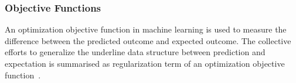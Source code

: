 \subsubsection{Objective Functions}
An optimization objective function in machine learning is used to measure the difference between the predicted outcome and expected outcome. The collective efforts to generalize the underline data structure between prediction and expectation is summarised as regularization term of an optimization objective function~\cite{goodfellow_2015}.  